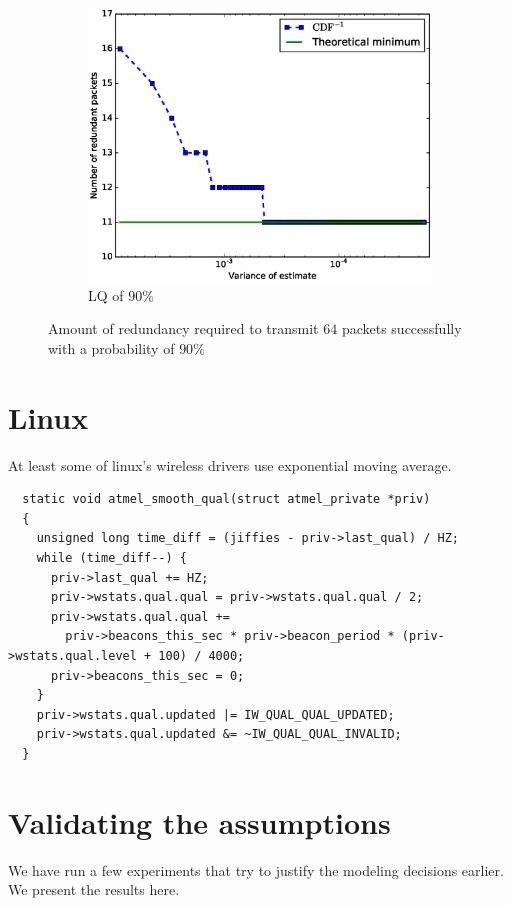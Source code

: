 \documentclass[10pt,a4paper]{article}
\begin{document}
\begin{figure}
\begin{subfigure}[b]{0.3\textwidth}
		\includegraphics[width=\textwidth]{prediction/converge-0-9}
		\caption{LQ of $90\%$}
	\end{subfigure}
	\caption{Amount of redundancy required to transmit $64$ packets successfully with a probability of $90\%$}
  \label{fig:prediction:convergence}
\end{figure}

\section{Linux}

At least some of linux's wireless drivers use exponential moving average.

\begin{verbatim}
  static void atmel_smooth_qual(struct atmel_private *priv)
  {
    unsigned long time_diff = (jiffies - priv->last_qual) / HZ;
    while (time_diff--) {
      priv->last_qual += HZ;
      priv->wstats.qual.qual = priv->wstats.qual.qual / 2;
      priv->wstats.qual.qual +=
        priv->beacons_this_sec * priv->beacon_period * (priv->wstats.qual.level + 100) / 4000;
      priv->beacons_this_sec = 0;
    }
    priv->wstats.qual.updated |= IW_QUAL_QUAL_UPDATED;
    priv->wstats.qual.updated &= ~IW_QUAL_QUAL_INVALID;
  }
\end{verbatim}

\section{Validating the assumptions}
We have run a few experiments that try to justify the modeling decisions earlier. We present the results here.
\end{document}
